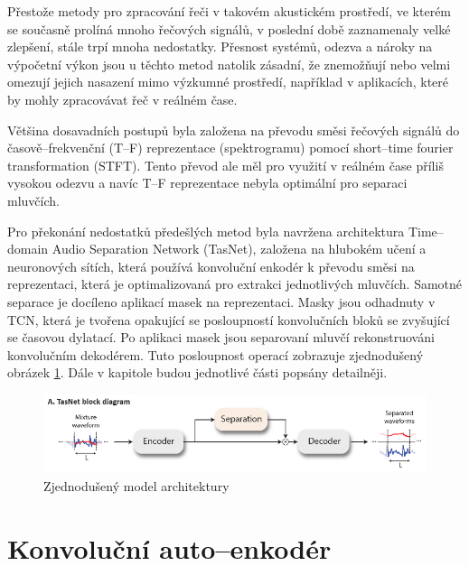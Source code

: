 Přestože metody pro zpracování řeči v takovém akustickém prostředí, ve kterém se současně prolíná mnoho řečových signálů, v poslední době zaznamenaly velké zlepšení, stále trpí mnoha nedostatky. Přesnost systémů, odezva a nároky na výpočetní výkon jsou u těchto metod natolik zásadní, že znemožňují nebo velmi omezují jejich nasazení mimo výzkumné prostředí, například v aplikacích, které by mohly zpracovávat řeč v reálném čase.

Většina dosavadních postupů byla založena na převodu směsi řečových signálů do časově--frekvenční (T--F) reprezentace (spektrogramu) pomocí short--time fourier transformation (STFT)\cite{speechseparationoverview}. Tento převod ale měl pro využití v reálném čase příliš vysokou odezvu a navíc T--F reprezentace nebyla optimální pro separaci mluvčích.

Pro překonání nedostatků předešlých metod byla navržena architektura Time--domain Audio Separation Network (TasNet), založena na hlubokém učení a neuronových sítích, která používá konvoluční enkodér k převodu směsi na reprezentaci, která je optimalizovaná pro extrakci jednotlivých mluvčích. Samotné separace je docíleno aplikací masek na reprezentaci. Masky jsou odhadnuty v TCN, která je tvořena opakující se posloupností konvolučních bloků se zvyšující se časovou dylatací. Po aplikaci masek jsou separovaní mluvčí rekonstruováni konvolučním dekodérem. Tuto posloupnost operací zobrazuje zjednodušený obrázek \ref{fig:tasnet-pipe}. Dále v kapitole budou jednotlivé části popsány detailněji.

\begin{figure}[H]
    \centering
    \includegraphics[scale=0.5]{obrazky-figures/tasnet-pipe.png}
    \caption{\label{fig:tasnet-pipe}Zjednodušený model architektury}
\end{figure}




\section{Konvoluční auto--enkodér}

